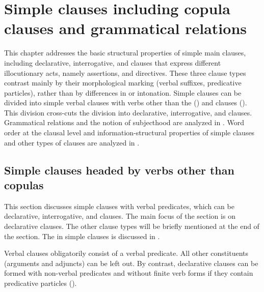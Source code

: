 \chapter{Simple clauses including copula clauses and grammatical relations}
\label{cpt:Simpleclauses}

This chapter addresses the basic structural properties of simple main clauses, including declarative, interrogative,  and  clauses that express different illocutionary acts, namely assertions,  and directives. These three clause types contrast mainly by their morphological marking (verbal suffixes, predicative particles), rather than by differences in  or intonation. Simple clauses can be divided into simple verbal clauses with verbs other than the  () and  clauses (). This division cross-cuts the division into declarative, interrogative,  and  clauses. Grammatical relations and the notion of subjecthood are analyzed in . Word order at the clausal level and information-structural properties of simple clauses and other types of clauses are analyzed in . 



\section{Simple clauses headed by verbs other than copulas}
\label{sec:Simple clauses headed by verbs other than copulae}

This section discusses simple clauses with verbal predicates, which can be declarative, interrogative,  and  clauses. The main focus of the section is on declarative clauses. The other clause types will be briefly mentioned at the end of the section. The  in simple clauses is discussed in .

Verbal clauses obligatorily consist of a verbal predicate. All other constituents (arguments and adjuncts) can be left out. By contrast, declarative  clauses can be formed with non-verbal predicates and without finite verb forms if they contain predicative particles ().  

